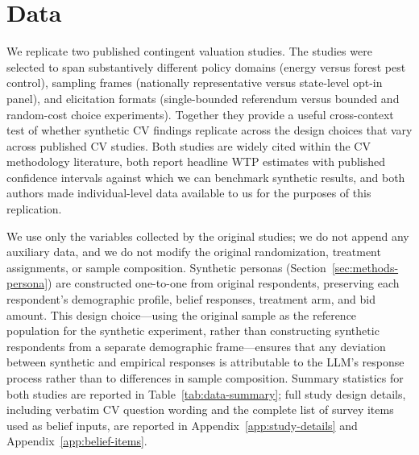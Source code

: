 \documentclass[12pt]{article}
\begin{document}
%

\section{Data}\label{sec:data}

We replicate two published contingent valuation studies. The studies were selected to span substantively different policy domains (energy versus forest pest control), sampling frames (nationally representative versus state-level opt-in panel), and elicitation formats (single-bounded referendum versus bounded and random-cost choice experiments). Together they provide a useful cross-context test of whether synthetic CV findings replicate across the design choices that vary across published CV studies. Both studies are widely cited within the CV methodology literature, both report headline WTP estimates with published confidence intervals against which we can benchmark synthetic results, and both authors made individual-level data available to us for the purposes of this replication.

We use only the variables collected by the original studies; we do not append any auxiliary data, and we do not modify the original randomization, treatment assignments, or sample composition. Synthetic personas (Section~\ref{sec:methods-persona}) are constructed one-to-one from original respondents, preserving each respondent's demographic profile, belief responses, treatment arm, and bid amount. This design choice---using the original sample as the reference population for the synthetic experiment, rather than constructing synthetic respondents from a separate demographic frame---ensures that any deviation between synthetic and empirical responses is attributable to the LLM's response process rather than to differences in sample composition. Summary statistics for both studies are reported in Table~\ref{tab:data-summary}; full study design details, including verbatim CV question wording and the complete list of survey items used as belief inputs, are reported in Appendix~\ref{app:study-details} and Appendix~\ref{app:belief-items}.
\end{document}
